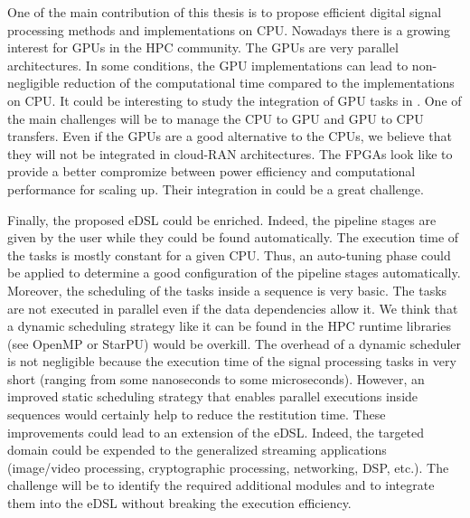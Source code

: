 One of the main contribution of this thesis is to propose efficient digital
signal processing methods and implementations on CPU. Nowadays there is a
growing interest for GPUs in the HPC community. The GPUs are very parallel
architectures. In some conditions, the GPU implementations can lead to
non-negligible reduction of the computational time compared to the
implementations on CPU. It could be interesting to study the integration of
GPU tasks in \AFFECT. One of the main challenges will be to manage the CPU to
GPU and GPU to CPU transfers. Even if the GPUs are a good alternative to the
CPUs, we believe that they will not be integrated in cloud-RAN architectures.
The FPGAs look like to provide a better compromize between power efficiency and
computational performance for scaling up. Their integration in \AFFECT could be
a great challenge.

Finally, the proposed eDSL could be enriched. Indeed, the pipeline stages are
given by the user while they could be found automatically. The execution time of
the tasks is mostly constant for a given CPU. Thus, an auto-tuning phase could
be applied to determine a good configuration of the pipeline stages
automatically. Moreover, the scheduling of the tasks inside a sequence is very
basic. The tasks are not executed in parallel even if the data dependencies
allow it. We think that a dynamic scheduling strategy like it can be found in
the HPC runtime libraries (see OpenMP or StarPU) would be overkill. The overhead
of a dynamic scheduler is not negligible because the execution time of the
signal processing tasks in very short (ranging from some nanoseconds to some
microseconds). However, an improved static scheduling strategy that enables
parallel executions inside sequences would certainly help to reduce the
restitution time. These improvements could lead to an extension of the \AFFECT
eDSL. Indeed, the targeted domain could be expended to the generalized streaming
applications (image/video processing, cryptographic processing, networking, DSP,
etc.). The challenge will be to identify the required additional modules and to
integrate them into the eDSL without breaking the execution efficiency.
